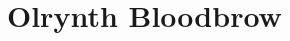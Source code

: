 \documentclass[12pt, oneside]{book}
\begin{document}
    \frontmatter
    \chapter{Olrynth Bloodbrow}
    

    \mainmatter
    \chapter{}
    
\end{document}

